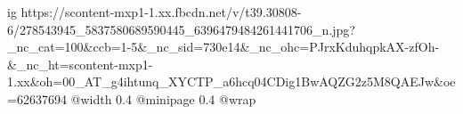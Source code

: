  
 
 
 
 

\ifcmt
  ig https://scontent-mxp1-1.xx.fbcdn.net/v/t39.30808-6/278543945_5837580689590445_6396479484261441706_n.jpg?_nc_cat=100&ccb=1-5&_nc_sid=730e14&_nc_ohc=PJrxKduhqpkAX-zfOh-&_nc_ht=scontent-mxp1-1.xx&oh=00_AT_g4ihtunq_XYCTP_a6hcq04CDig1BwAQZG2z5M8QAEJw&oe=62637694
  @width 0.4
  @minipage 0.4
  @wrap \parpic[r]
\fi
